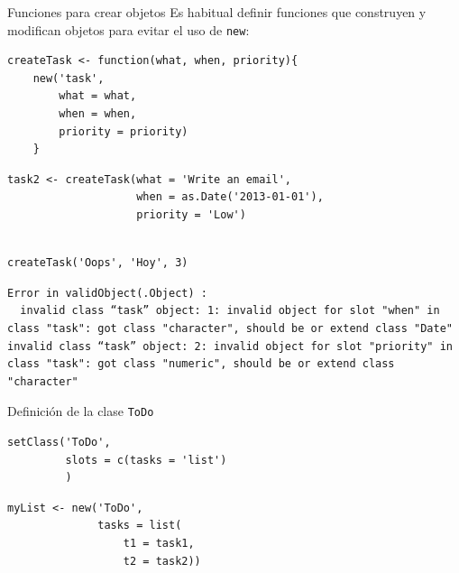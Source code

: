 \documentclass[xcolor={usenames,svgnames,dvipsnames}]{beamer}
\begin{document}
\begin{frame}[fragile,label={sec:orgcd9f611}]{Funciones para crear objetos}
 Es habitual definir funciones que construyen y modifican objetos
para evitar el uso de \texttt{new}:
\lstset{language=r,label= ,caption= ,captionpos=b,numbers=none}
\begin{lstlisting}
createTask <- function(what, when, priority){
    new('task',
        what = what,
        when = when,
        priority = priority)
    }  
\end{lstlisting}

\lstset{language=r,label= ,caption= ,captionpos=b,numbers=none}
\begin{lstlisting}
task2 <- createTask(what = 'Write an email',
                    when = as.Date('2013-01-01'),
                    priority = 'Low')
  
\end{lstlisting}

\lstset{language=r,label= ,caption= ,captionpos=b,numbers=none}
\begin{lstlisting}
createTask('Oops', 'Hoy', 3)
\end{lstlisting}

\begin{verbatim}
Error in validObject(.Object) : 
  invalid class “task” object: 1: invalid object for slot "when" in class "task": got class "character", should be or extend class "Date"
invalid class “task” object: 2: invalid object for slot "priority" in class "task": got class "numeric", should be or extend class "character"
\end{verbatim}
\end{frame}

\begin{frame}[fragile,label={sec:org8dd4e5f}]{Definición de la clase \texttt{ToDo}}
 \lstset{language=r,label= ,caption= ,captionpos=b,numbers=none}
\begin{lstlisting}
setClass('ToDo',
         slots = c(tasks = 'list')
         )
\end{lstlisting}

\lstset{language=r,label= ,caption= ,captionpos=b,numbers=none}
\begin{lstlisting}
myList <- new('ToDo',
              tasks = list(
                  t1 = task1,
                  t2 = task2))
\end{lstlisting}
\end{frame}
\end{document}

